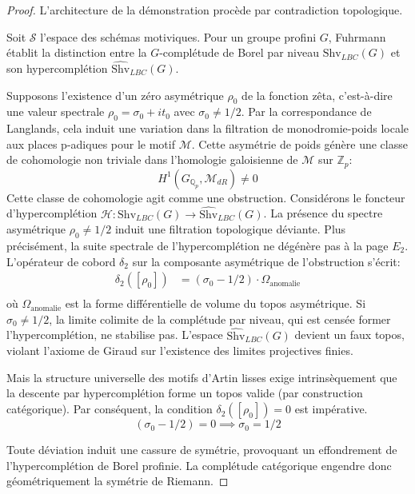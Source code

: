 \documentclass[
]{article}
\begin{document}
\begin{proof}
L'architecture de la démonstration procède par contradiction topologique.

Soit $\mathcal{S}$ l'espace des schémas motiviques. Pour un groupe profini $G$, Fuhrmann établit la distinction entre la $G$-complétude de Borel par niveau $\mathrm{Shv}_{LBC}(G)$ et son hypercomplétion $\widehat{\mathrm{Shv}}_{LBC}(G)$.

Supposons l'existence d'un zéro asymétrique $\rho_0$ de la fonction zêta, c'est-à-dire une valeur spectrale $\rho_0 = \sigma_0 + it_0$ avec $\sigma_0 \neq 1/2$.
Par la correspondance de Langlands, cela induit une variation dans la filtration de monodromie-poids locale aux places p-adiques pour le motif $\mathcal{M}$.
Cette asymétrie de poids génère une classe de cohomologie non triviale dans l'homologie galoisienne de $\mathcal{M}$ sur $\mathbb{Z}_p$:
\begin{equation*}
    H^1(G_{\mathbb{Q}_p}, \mathcal{M}_{dR}) \neq 0
\end{equation*}
Cette classe de cohomologie agit comme une obstruction.
Considérons le foncteur d'hypercomplétion $\mathcal{H}: \mathrm{Shv}_{LBC}(G) \to \widehat{\mathrm{Shv}}_{LBC}(G)$.
La présence du spectre asymétrique $\rho_0 \neq 1/2$ induit une filtration topologique déviante. Plus précisément, la suite spectrale de l'hypercomplétion ne dégénère pas à la page $E_2$.
L'opérateur de cobord $\delta_2$ sur la composante asymétrique de l'obstruction s'écrit:
\begin{align*}
    \delta_2([\rho_0]) &= (\sigma_0 - 1/2) \cdot \Omega_{\text{anomalie}} \\
\end{align*}
où $\Omega_{\text{anomalie}}$ est la forme différentielle de volume du topos asymétrique.
Si $\sigma_0 \neq 1/2$, la limite colimite de la complétude par niveau, qui est censée former l'hypercomplétion, ne stabilise pas.
L'espace $\widehat{\mathrm{Shv}}_{LBC}(G)$ devient un faux topos, violant l'axiome de Giraud sur l'existence des limites projectives finies.

Mais la structure universelle des motifs d'Artin lisses exige intrinsèquement que la descente par hypercomplétion forme un topos valide (par construction catégorique).
Par conséquent, la condition $\delta_2([\rho_0]) = 0$ est impérative.
\begin{equation*}
    (\sigma_0 - 1/2) = 0 \implies \sigma_0 = 1/2
\end{equation*}

Toute déviation induit une cassure de symétrie, provoquant un effondrement de l'hypercomplétion de Borel profinie.
La complétude catégorique engendre donc géométriquement la symétrie de Riemann.
\end{proof}
\end{document}
